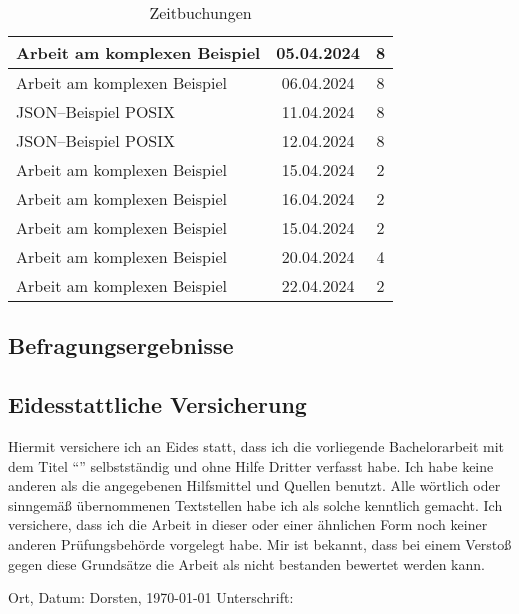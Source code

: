 \begin{table}[H]
\begin{tabular}{|l|c|c|}
        \hline
        Arbeit am komplexen Beispiel           & 05.04.2024 & 8              \\
        \hline
        Arbeit am komplexen Beispiel           & 06.04.2024 & 8              \\
        \hline
        \ac{JSON}--Beispiel \ac{POSIX}         & 11.04.2024 & 8              \\
        \hline
        \ac{JSON}--Beispiel \ac{POSIX}         & 12.04.2024 & 8              \\
        \hline
        Arbeit am komplexen Beispiel           & 15.04.2024 & 2              \\
        \hline
        Arbeit am komplexen Beispiel           & 16.04.2024 & 2              \\
        \hline
        Arbeit am komplexen Beispiel           & 15.04.2024 & 2              \\
        \hline
        Arbeit am komplexen Beispiel           & 20.04.2024 & 4              \\
        \hline
        Arbeit am komplexen Beispiel           & 22.04.2024 & 2              \\
        \hline
    \end{tabular}
    \caption{Zeitbuchungen}
    \label{tab:zeitbuchungen-long}
\end{table}

\subsection{Befragungsergebnisse}\label{appendix:befragungsergebnisse}



\subsection{Eidesstattliche Versicherung}\label{appendix:eidesstattliche-versicherung}
Hiermit versichere ich an Eides statt, dass ich die vorliegende Bachelorarbeit mit dem Titel \enquote{\thetitle} selbstständig und ohne Hilfe Dritter verfasst habe.
Ich habe keine anderen als die angegebenen Hilfsmittel und Quellen benutzt.
Alle wörtlich oder sinngemäß übernommenen Textstellen habe ich als solche kenntlich gemacht.
Ich versichere, dass ich die Arbeit in dieser oder einer ähnlichen Form noch keiner anderen Prüfungsbehörde vorgelegt habe.
Mir ist bekannt, dass bei einem Verstoß gegen diese Grundsätze die Arbeit als nicht bestanden bewertet werden kann.

\vfill

\noindent Ort, Datum: Dorsten, \today \hspace{1cm} Unterschrift: \hrulefill           \\
 \theauthor
